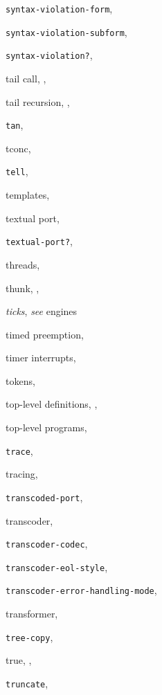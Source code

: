 {\begin{multicols}{2}
\texttt{syntax-violation-form}, \textit{\pageref{exceptions_s30}}
  
\texttt{syntax-violation-subform}, \textit{\pageref{exceptions_s30}}
  
\texttt{syntax-violation?}, \textit{\pageref{exceptions_s30}}
  
tail call, \pageref{intro_s23}, \pageref{further_s44}
  
tail recursion, \pageref{intro_s20}, \pageref{further_s45}
  
\texttt{tan}, \textit{\pageref{objects_s131}}
  
tconc, \pageref{start_s181}
  
\texttt{tell}, \pageref{start_s170}
  
templates, \pageref{syntax_s23}
  
textual port, \pageref{io_s7}
  
\texttt{textual-port?}, \textit{\pageref{io_s45}}
  
threads, \pageref{examples_s86}
  
thunk, \pageref{start_s173}, \pageref{control_s58}
  
\textit{ticks}, \textit{see} engines
  
timed preemption, \pageref{examples_s83}
  
timer interrupts, \pageref{examples_s97}
  
tokens, \pageref{grammar_s1}
  
top-level definitions, \pageref{start_s76}, \pageref{binding_s27}
  
top-level programs, \pageref{libraries_s1}
  
\texttt{trace}, \pageref{start_s138}
  
tracing, \pageref{start_s137}
  
\texttt{transcoded-port}, \textit{\pageref{io_s47}}
  
transcoder, \pageref{io_s9}
  
\texttt{transcoder-codec}, \textit{\pageref{io_s20}}
  
\texttt{transcoder-eol-style}, \textit{\pageref{io_s20}}
  
\texttt{transcoder-error-handling-mode}, \textit{\pageref{io_s20}}
  
transformer, \pageref{further_s14}
  
\texttt{tree-copy}, \pageref{start_s144}
  
true, \pageref{intro_s36}, \pageref{start_s106}
  
\texttt{truncate}, \textit{\pageref{objects_s101}}
  

\end{multicols}}
